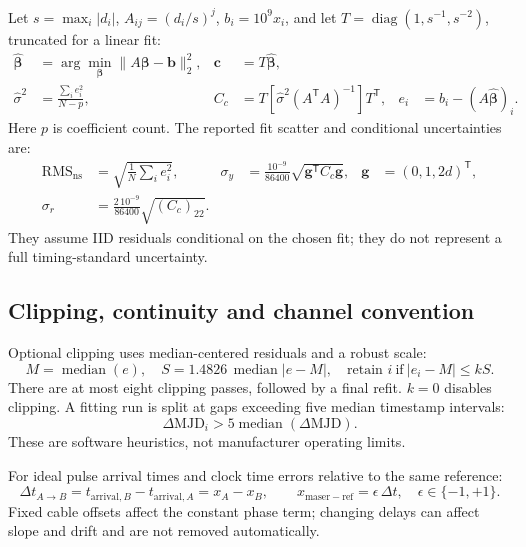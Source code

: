 \documentclass[11pt,a4paper]{article}
\begin{document}
Let \(s=\max_i|d_i|\), \(A_{ij}=(d_i/s)^j\), \(b_i=10^9x_i\), and let
\(T=\operatorname{diag}(1,s^{-1},s^{-2})\), truncated for a linear fit:
\begin{align}
\widehat{\boldsymbol\beta}&=\arg\min_{\boldsymbol\beta}
 \|A\boldsymbol\beta-\mathbf b\|_2^2,&
\mathbf c&=T\widehat{\boldsymbol\beta}, \tag{A6}\\
\widehat{\sigma}^2&=\frac{\sum_i e_i^2}{N-p},&
C_c&=T\left[\widehat{\sigma}^2(A^\mathsf{T}A)^{-1}\right]T^\mathsf{T},
 & e_i&=b_i-(A\widehat{\boldsymbol\beta})_i. \tag{A7}
\end{align}
Here \(p\) is coefficient count. The reported fit scatter and conditional
uncertainties are:
\begin{align}
\mathrm{RMS}_{\mathrm{ns}}&=\sqrt{\frac1N\sum_i e_i^2},&
\sigma_y&=\frac{10^{-9}}{86400}\sqrt{\mathbf g^\mathsf{T}C_c\mathbf g},
 &\mathbf g&=(0,1,2d)^\mathsf{T}, \tag{A8}\\
\sigma_r&=\frac{2\,10^{-9}}{86400}\sqrt{(C_c)_{22}}. \tag{A9}
\end{align}
They assume IID residuals conditional on the chosen fit; they do not represent
a full timing-standard uncertainty.
\clearpage

\subsection{Clipping, continuity and channel convention}
Optional clipping uses median-centered residuals and a robust scale:
\begin{equation}
M=\operatorname{median}(e),\quad
S=1.4826\,\operatorname{median}|e-M|,\quad
\text{retain }i\ \text{if}\ |e_i-M|\le kS. \tag{A10}
\end{equation}
There are at most eight clipping passes, followed by a final refit. \(k=0\)
disables clipping. A fitting run is split at gaps exceeding five median
timestamp intervals:
\begin{equation}
\Delta\mathrm{MJD}_i>5\operatorname{median}(\Delta\mathrm{MJD}). \tag{A11}
\end{equation}
These are software heuristics, not manufacturer operating limits.

For ideal pulse arrival times and clock time errors relative to the same
reference:
\begin{equation}
\Delta t_{A\rightarrow B}=t_{\mathrm{arrival},B}-t_{\mathrm{arrival},A}
=x_A-x_B,\qquad x_{\mathrm{maser-ref}}=\epsilon\,\Delta t,\quad
\epsilon\in\{-1,+1\}. \tag{A12}
\end{equation}
Fixed cable offsets affect the constant phase term; changing delays can affect
slope and drift and are not removed automatically.
\end{document}
